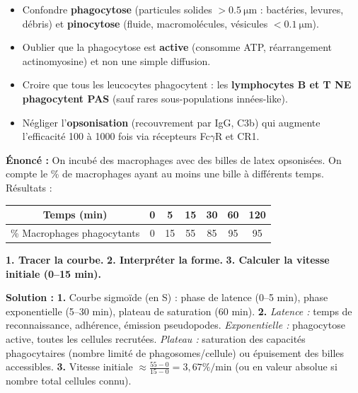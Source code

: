 \documentclass[11pt]{article}
\begin{document}
\begin{attention}
\begin{itemize}
    \item Confondre \textbf{phagocytose} (particules solides $> \SI{0,5}{\micro\meter}$ : bactéries, levures, débris) et \textbf{pinocytose} (fluide, macromolécules, vésicules $< \SI{0,1}{\micro\meter}$).
    \item Oublier que la phagocytose est \textbf{active} (consomme ATP, réarrangement actinomyosine) et non une simple diffusion.
    \item Croire que tous les leucocytes phagocytent : les \textbf{lymphocytes B et T NE phagocytent PAS} (sauf rares sous-populations innées-like).
    \item Négliger l'\textbf{opsonisation} (recouvrement par IgG, C3b) qui augmente l'efficacité 100 à 1000 fois via récepteurs Fc$\gamma$R et CR1.
\end{itemize}
\end{attention}

\begin{exoresolu}
\textbf{Énoncé :} On incubé des macrophages avec des billes de latex opsonisées. On compte le \% de macrophages ayant au moins une bille à différents temps. Résultats :
\begin{center}
\begin{tabular}{|c|c|c|c|c|c|c|}\hline
Temps (min) & 0 & 5 & 15 & 30 & 60 & 120 \\ \hline
\% Macrophages phagocytants & 0 & 15 & 55 & 85 & 95 & 95 \\ \hline
\end{tabular}
\end{center}
\textbf{1. Tracer la courbe.} \textbf{2. Interpréter la forme.} \textbf{3. Calculer la vitesse initiale (0--15 min).}

\tcblower
\textbf{Solution :}
\textbf{1.} Courbe sigmoïde (en S) : phase de latence (0--5 min), phase exponentielle (5--30 min), plateau de saturation (60 min).
\textbf{2.} \textit{Latence :} temps de reconnaissance, adhérence, émission pseudopodes. \textit{Exponentielle :} phagocytose active, toutes les cellules recrutées. \textit{Plateau :} saturation des capacités phagocytaires (nombre limité de phagosomes/cellule) ou épuisement des billes accessibles.
\textbf{3.} Vitesse initiale $\approx \frac{55-0}{15-0} = 3,67\%/\text{min}$ (ou en valeur absolue si nombre total cellules connu).
\end{exoresolu}
\end{document}
